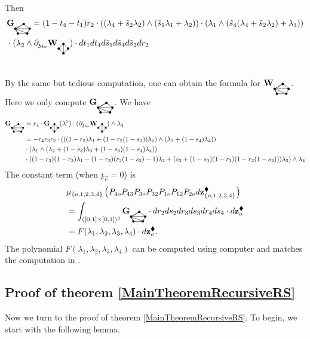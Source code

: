\documentclass[11pt]{amsart}
\newcommand{\bgraphG}{
  \mathbf{G}_{\tikz[baseline=-0.5ex]{
      \coordinate (A) at (0,0);
      \coordinate (B) at (4mm,0);
      \coordinate (C) at (5mm,2mm);
      \coordinate (D) at (2.5mm,4mm);
      \coordinate (E) at (-1mm,2mm);

      \fill (A) circle (0.5mm);
      \fill (B) circle (0.5mm);
      \fill (C) circle (0.5mm);
      \fill (D) circle (0.5mm);
      \fill (E) circle (0.5mm);

      \draw (A) -- (B);
      \draw (B) -- (C);
      \draw (C) -- (D);
      \draw (D) -- (E);
      \draw (E) -- (A);

      \draw (E) -- (A);
      \draw (E) -- (B);
      \draw (E) -- (C);
      \draw (E) -- (D);
  }}
}
\newcommand{\bgraphW}{
  \mathbf{W}_{\tikz[baseline=-0.5ex]{
      \coordinate (A) at (0,0);
      \coordinate (B) at (4mm,0);
      \coordinate (C) at (5mm,2mm);
      \coordinate (D) at (2.5mm,4mm);
      \coordinate (E) at (-1mm,2mm);

      \fill (A) circle (0.5mm);
      \fill (B) circle (0.5mm);
      \fill (C) circle (0.5mm);
      \fill (D) circle (0.5mm);
      \fill (E) circle (0.5mm);

      \draw (A) -- (B);
      \draw (B) -- (C);
      \draw (C) -- (D);
      \draw (D) -- (E);
      \draw (E) -- (A);

      \draw (E) -- (A);
      \draw (E) -- (B);
      \draw (E) -- (C);
      \draw (E) -- (D);
  }}
}
\newcommand{\agraphG}{
  \mathbf{G}_{\tikz[baseline=-0.5ex]{
      \coordinate (A) at (0,0);
      \coordinate (B) at (4mm,0);
      \coordinate (C) at (2mm,2mm);
      \coordinate (D) at (2mm,-2mm);

      \fill (A) circle (0.5mm);
      \fill (B) circle (0.5mm);
      \fill (C) circle (0.5mm);
      \fill (D) circle (0.5mm);

      \draw (A) -- (C);
      \draw (A) -- (D);
      \draw (C) -- (D);
      \draw (B) -- (C);
      \draw (B) -- (D);
  }}
}
\newcommand{\agraphW}{
  \mathbf{W}_{\tikz[baseline=-0.5ex]{
      \coordinate (A) at (0,0);
      \coordinate (B) at (4mm,0);
      \coordinate (C) at (2mm,2mm);
      \coordinate (D) at (2mm,-2mm);

      \fill (A) circle (0.5mm);
      \fill (B) circle (0.5mm);
      \fill (C) circle (0.5mm);
      \fill (D) circle (0.5mm);

      \draw (A) -- (C);
      \draw (A) -- (D);
      \draw (C) -- (D);
      \draw (B) -- (C);
      \draw (B) -- (D);
  }}
}
\theoremstyle{definition}
\theoremstyle{remark}
\numberwithin{equation}{section}
\begin{document}
  Then
  \begin{align*}
 &\bgraphG =  (1-t_4-t_1)r_2\cdot((\lambda_4+\tilde{s}_2\lambda_2)\wedge(\tilde{s}_1\lambda_1+\lambda_2))\cdot (\lambda_1\wedge(\tilde{s}_4(\lambda_4+\tilde{s}_2\lambda_2)+\lambda_3)) \\ &\cdot  (\lambda_2\wedge \partial_{\mathfrak{z}_{4o}}\agraphW)\cdot dt_1dt_4d\tilde{s}_1d\tilde{s}_4d\tilde{s}_2dr_2 \\
     &
  \end{align*}
\fi

By the same but tedious computation, one can obtain the formula for $\bgraphW$. Here we only compute $\bgraphG$.
We have
\begin{align*}
   \bgraphG&= r_4\cdot \agraphG(\lambda^\triangleright) \cdot(\partial_{\mathfrak{z}_{3o}}\agraphW)\wedge \lambda_4  \\
   &=-r_4r_3r_2\cdot \left(\left((1-r_2)\lambda_1+(1-r_2(1-s_2))\lambda_2\right)\wedge (\lambda_3+(1-s_4)\lambda_4)\right) \\
   & \cdot\left(\lambda_1\wedge\left(\lambda_2+(1-s_3)\lambda_3+(1-s_3)(1-s_4)\lambda_4\right) \right)\\ &\cdot  \left((1-r_3)(1-r_2)\lambda_1-(1-r_3)(r_2(1-s_2)-1)\lambda_2+(s_3+(1-s_3)(1-r_3)(1-r_2(1-s_2)))\lambda_3\right)\wedge \lambda_4
\end{align*}
The constant term (when $\mathfrak{z}_{\vec{e}}=0$) is
    \begin{align*}
&\mu_{\{o,1,2,3,4\}}\left(P_{4o}P_{43}P_{3o}P_{32}P_{1o}P_{12}P_{2o}d\mathbf{z}^{\blacklozenge}_{\{o,1,2,3,4\}}\right)
\\
&=\int_{([0,1]\times[0,1])^3}\bgraphG\cdot dr_2ds_2dr_3ds_3dr_4ds_4\cdot d\mathbf{z}^{\blacklozenge}_o\\
&=F(\lambda_1,\lambda_2,\lambda_3,\lambda_4)\cdot d\mathbf{z}^{\blacklozenge}_o.
  \end{align*}
  The polynomial $F(\lambda_1,\lambda_2,\lambda_3,\lambda_4)$ can be computed using computer and matches the
  computation in \cite{budzik2023feynman}.

  \subsection{Proof of theorem \ref{MainTheoremRecursiveRS}}
  Now we turn to the proof of theorem \ref{MainTheoremRecursiveRS}.
  To begin, we start with the following lemma.
\end{document}
